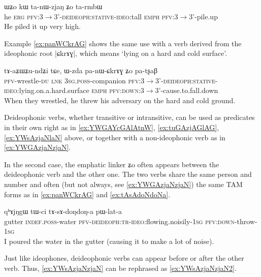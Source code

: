 \documentclass[oldfontcommands,oneside,a4paper,11pt]{article}
\newcommand{\ipa}[1]{{\phon \mbox{#1}}} %
\begin{document}
     \begin{exe}
     \ex \label{ex:tanWzjaN}
\gll
\ipa{ɯʑo} 	\ipa{kɯ} 	\ipa{ta-nɯ-zjaŋ} 	\ipa{ʑo} 	\ipa{ta-rmbɯ} \\
he \textsc{erg} \textsc{pfv:3$\rightarrow$3'-deideoph:stative-ideo}:tall \textsc{emph} \textsc{pfv}:3$\rightarrow$3'-pile.up  \\
\glt He piled it up very high.
\end{exe}

Example \ref{ex:panWCkrAG} shows the same use with a verb derived from the ideophonic root |\ipa{ɕkrɤɣ}|, which means  `lying on a hard and cold surface'.

     \begin{exe}
     \ex \label{ex:panWCkrAG}
\gll
\ipa{tɤ-aʑɯʑu-ndʑi} 	\ipa{tɕe,} 	\ipa{ɯ-zda} 	\ipa{pa-nɯ-ɕkrɤɣ} 	\ipa{ʑo} 	\ipa{pa-tʂaβ} \\
\textsc{pfv}-wrestle-\textsc{du} \textsc{lnk} \textsc{3sg.poss}-companion \textsc{pfv:3$\rightarrow$3'-deideoph:stative-ideo}:lying.on.a.hard.surface \textsc{emph} \textsc{pfv:down:3$\rightarrow$3'}-cause.to.fall.down \\
\glt When they wrestled, he threw his adversary on the hard and cold ground. 
\end{exe}


Deideophonic verbs, whether transitive or intransitive, can be used as predicates in their own right as in \ref{ex:YWGAYcGAlAtnW}, \ref{ex:tuGAzjAGlAG}, \ref{ex:YWsAzjaNlaN} above, or together with a non-ideophonic verb as in \ref{ex:YWGAzjaNzjaN}. 

	In the second case, the emphatic linker \ipa{ʑo} often appears between the deideophonic verb and the other one. The two verbs    share the same person and number and often (but not always, see \ref{ex:YWGAzjaNzjaN}) the same TAM forms as in \ref{ex:panWCkrAG} and \ref{ex:tAsAdoNdoNa}.
	
	     \begin{exe}
     \ex \label{ex:tAsAdoNdoNa}
\gll
	\ipa{qʰɤjŋgɯ} 	\ipa{tɯ-ci} 	\ipa{tɤ-sɤ-doŋdoŋ-a} 	\ipa{pɯ-lat-a}\\
gutter \textsc{indef.poss}-water \textsc{pfv-deideoph:tr-ideo}:flowing.noisily-\textsc{1sg} \textsc{pfv:down}-throw-\textsc{1sg} \\
\glt I poured the water in the gutter (causing it to make a lot of noise).
\end{exe}

Just like ideophones, deideophonic verbs can appear before or after the other verb. Thus, \ref{ex:YWsAzjaNzjaN} can be rephrased as \ref{ex:YWsAzjaNzjaN2}.
\end{document}
